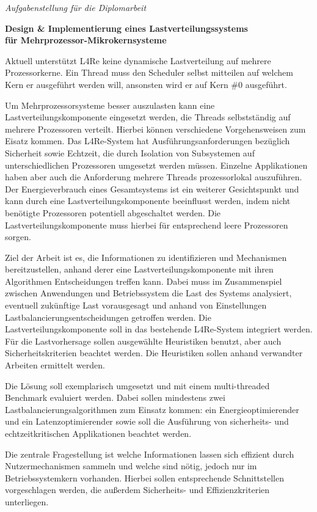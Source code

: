 \begin{centering}
\large
\textit{Aufgabenstellung für die Diplomarbeit}
\\
\end{centering}

\vspace{1cm}

\begin{flushright}
\normalsize\noindent
\textbf{Design \& Implementierung eines Lastverteilungssystems\\ für
Mehrprozessor-Mikrokernsysteme}\\
\end{flushright}
\vspace{3mm}

Aktuell unterstützt L4Re keine dynamische Lastverteilung auf mehrere
Prozessorkerne. Ein Thread muss den Scheduler selbst mitteilen auf welchem Kern
er ausgeführt werden will, ansonsten wird er auf Kern \#0 ausgeführt.

Um Mehrprozessorsysteme besser auszulasten kann eine Lastverteilungskomponente
eingesetzt werden, die Threads selbstständig auf mehrere Prozessoren verteilt.
Hierbei können verschiedene Vorgehensweisen zum Eisatz kommen.
Das L4Re-System hat Ausführungsanforderungen bezüglich Sicherheit sowie
Echtzeit, die durch Isolation von Subsystemen auf unterschiedlichen Prozessoren
umgesetzt werden müssen. Einzelne Applikationen haben aber auch die Anforderung
mehrere Threads prozessorlokal auszuführen.
Der Energieverbrauch eines Gesamtsystems ist ein weiterer Gesichtspunkt und
kann durch eine Lastverteilungskomponente beeinflusst werden, indem nicht
benötigte Prozessoren potentiell abgeschaltet werden. Die
Lastverteilungskomponente muss hierbei für entsprechend leere Prozessoren
sorgen.

Ziel der Arbeit ist es, die Informationen zu identifizieren und Mechanismen
bereitzustellen, anhand derer eine Lastverteilungskomponente mit  ihren
Algorithmen Entscheidungen treffen kann. Dabei muss im Zusammenspiel zwischen
Anwendungen und Betriebssystem die Last des Systems analysiert, eventuell
zukünftige Last vorausgesagt und anhand von Einstellungen
Lastbalancierungsentscheidungen getroffen werden.
Die Lastverteilungskomponente soll in das bestehende L4Re-System integriert
werden.
Für die Lastvorhersage sollen ausgewählte Heuristiken benutzt, aber auch
Sicherheitskriterien beachtet werden.
Die Heuristiken sollen anhand verwandter Arbeiten ermittelt werden.

Die Lösung soll exemplarisch umgesetzt und mit einem multi-threaded Benchmark
evaluiert werden.
Dabei sollen mindestens zwei Lastbalancierungsalgorithmen zum Einsatz kommen: ein
Energieoptimierender und ein Latenzoptimierender sowie soll die Ausführung von
sicherheits- und echtzeitkritischen Applikationen beachtet werden.

Die zentrale Fragestellung ist welche Informationen lassen sich effizient durch
Nutzermechanismen sammeln und welche sind nötig, jedoch nur im
Betriebssystemkern vorhanden. Hierbei sollen entsprechende Schnittstellen
vorgeschlagen werden, die außerdem Sicherheits- und Effizienzkriterien
unterliegen.
